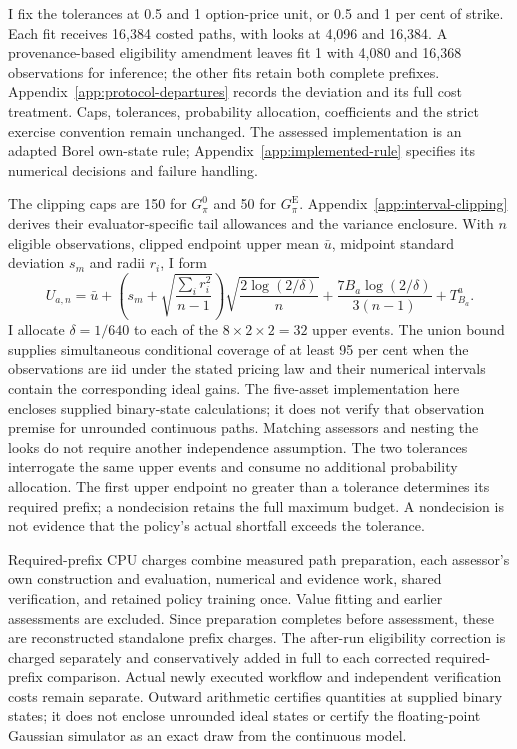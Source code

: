 \documentclass[11pt]{article}
\begin{document}
I fix the tolerances at 0.5 and 1 option-price unit, or 0.5 and 1 per cent of strike. Each fit receives 16,384 costed paths, with looks at 4,096 and 16,384. A provenance-based eligibility amendment leaves fit 1 with 4,080 and 16,368 observations for inference; the other fits retain both complete prefixes. Appendix~\ref{app:protocol-departures} records the deviation and its full cost treatment. Caps, tolerances, probability allocation, coefficients and the strict exercise convention remain unchanged. The assessed implementation is an adapted Borel own-state rule; Appendix~\ref{app:implemented-rule} specifies its numerical decisions and failure handling.

The clipping caps are 150 for $G^0_\pi$ and 50 for $G^{\mathrm E}_\pi$. Appendix~\ref{app:interval-clipping} derives their evaluator-specific tail allowances and the variance enclosure. With $n$ eligible observations, clipped endpoint upper mean $\bar u$, midpoint standard deviation $s_m$ and radii $r_i$, I form
\begin{equation}
 U_{a,n}=\bar u+
 \left(s_m+\sqrt{\frac{\sum_i r_i^2}{n-1}}\right)
 \sqrt{\frac{2\log(2/\delta)}{n}}
 +\frac{7B_a\log(2/\delta)}{3(n-1)}+T^a_{B_a}.
\label{eq:multivariate-monetary-upper}
\end{equation}
I allocate $\delta=1/640$ to each of the $8\times2\times2=32$ upper events. The union bound supplies simultaneous conditional coverage of at least 95 per cent when the observations are iid under the stated pricing law and their numerical intervals contain the corresponding ideal gains. The five-asset implementation here encloses supplied binary-state calculations; it does not verify that observation premise for unrounded continuous paths. Matching assessors and nesting the looks do not require another independence assumption. The two tolerances interrogate the same upper events and consume no additional probability allocation. The first upper endpoint no greater than a tolerance determines its required prefix; a nondecision retains the full maximum budget. A nondecision is not evidence that the policy's actual shortfall exceeds the tolerance.

Required-prefix CPU charges combine measured path preparation, each assessor's own construction and evaluation, numerical and evidence work, shared verification, and retained policy training once. Value fitting and earlier assessments are excluded. Since preparation completes before assessment, these are reconstructed standalone prefix charges. The after-run eligibility correction is charged separately and conservatively added in full to each corrected required-prefix comparison. Actual newly executed workflow and independent verification costs remain separate. Outward arithmetic certifies quantities at supplied binary states; it does not enclose unrounded ideal states or certify the floating-point Gaussian simulator as an exact draw from the continuous model.
\end{document}
